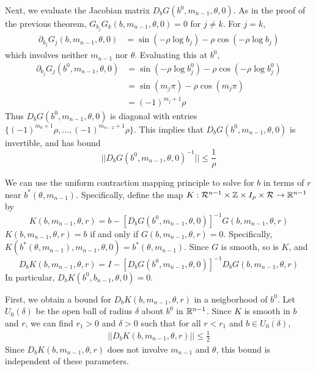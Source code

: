\documentclass[thesis.tex]{subfiles}
\begin{document}
Next, we evaluate the Jacobian matrix $D_b G(b^0, m_{n-1}, \theta, 0)$. As in the proof of the previous theorem, $G_{b_j} G_k(b, m_{n-1}, \theta, 0) = 0$ for $j \neq k$. For $j = k$,
\begin{align*}
\partial_{b_j} G_j(b, m_{n-1}, \theta, 0) &= \sin \left( -\rho \log b_j \right) - \rho \cos \left( -\rho \log b_j \right) 
\end{align*}
which involves neither $m_{n-1}$ nor $\theta$. Evaluating this at $b^0$,
\begin{align*}
\partial_{b_j} G_j(b^0, m_{n-1}, \theta, 0) &= \sin \left( -\rho \log b_j^0 \right) - \rho \cos \left( -\rho \log b_j^0 \right) \\
&= \sin \left( m_j \pi \right) - \rho \cos \left(m_j \pi \right) \\
&= (-1)^{m_j + 1} \rho
\end{align*}
Thus $D_b G(b^0, m_{n-1}, \theta, 0)$ is diagonal with entries $\{ (-1)^{m_0 + 1} \rho, \dots, (-1)^{m_{n-2} + 1} \rho \}$. This implies that $D_b G(b^0, m_{n-1}, \theta, 0)$ is invertible, and has bound
\begin{equation}\label{DbG0invbound}
||D_b G(b^0, m_{n-1}, \theta, 0)^{-1}|| \leq \frac{1}{\rho}
\end{equation}

We can use the uniform contraction mapping principle to solve for $b$ in terms of $r$ near $b^*(\theta, m_{n-1})$. Specifically, define the map $K: \mathcal{R}^{n-1} \times {\mathbb Z} \times I_\rho \times \mathcal{R} \rightarrow {\mathbb R}^{n-1}$ by
\begin{equation}\label{defKb}
K(b, m_{n-1}, \theta, r) = b - [D_b G(b^0, m_{n-1}, \theta, 0)]^{-1} G(b, m_{n-1}, \theta, r)
\end{equation}
$K(b, m_{n-1}, \theta, r) = b$ if and only if $G(b, m_{n-1}, \theta, r) = 0$. Specifically, $K(b^*(\theta, m_{n-1}), m_{n-1}, \theta, 0) = b^*(\theta, m_{n-1})$. Since $G$ is smooth, so is $K$, and 
\begin{equation}\label{DbK}
D_b K(b, m_{n-1}, \theta, r) = I - [D_b G(b^0, m_{n-1}, \theta, 0)]^{-1} D_b G(b, m_{n-1}, \theta, r)
\end{equation}
In particular, $D_b K(b^0, b_{n-1}, \theta, 0) = 0$.

First, we obtain a bound for $D_b K(b, m_{n-1}, \theta, r)$ in a neigborhood of $b^0$. Let $U_0(\delta)$ be the open ball of radius $\delta$ about $b^0$ in ${\mathbb R}^{n-1}$. Since $K$ is smooth in $b$ and $r$, we can find $r_1 > 0$ and $\delta > 0$ such that for all $r < r_1$ and $b \in \overline{ U_0(\delta) }$,  
\begin{align}\label{DbKbound}
|| D_b K(b, m_{n-1}, \theta, r)|| \leq \frac{1}{2}
\end{align}
Since $D_b K(b, m_{n-1}, \theta, r)$ does not involve $m_{n-1}$ and $\theta$, this bound is independent of these parameters.
\end{document}
